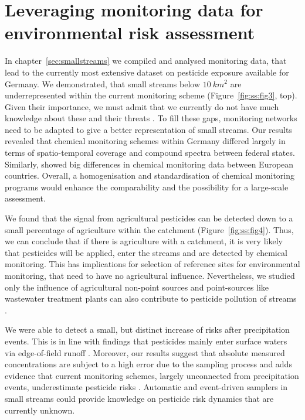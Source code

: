 \section{Leveraging monitoring data for environmental risk assessment}
In chapter~\ref{sec:smallstreams} we compiled and analysed monitoring data, that lead to the currently most extensive dataset on pesticide exposure available for Germany. 
We demonstrated, that small streams below $10~km^2$ are underrepresented within the current monitoring scheme (Figure~\ref{fig:ss:fig3}, top).
Given their importance, we must admit that we currently do not have much knowledge about these and their threats \citep{biggs_importance_2016, lorenz_specifics_2016}. 
To fill these gaps, monitoring networks need to be adapted to give a better representation of small streams. 
Our results revealed that chemical monitoring schemes within Germany differed largely in terms of spatio-temporal coverage and compound spectra between federal states. 
Similarly, \citet{malaj_organic_2014} showed big differences in chemical monitoring data between European countries.
Overall, a homogenisation and standardisation of chemical monitoring programs  would enhance the comparability and the possibility for a large-scale assessment.

We found that the signal from agricultural pesticides can be detected down to a small percentage of agriculture within the catchment (Figure~\ref{fig:ss:fig4}).
Thus, we can conclude that if there is agriculture with a catchment, it is very likely that pesticides will be applied, enter the streams and are detected by chemical monitoring.
This has implications for selection of reference sites for environmental monitoring, that need to have no agricultural influence.
Nevertheless, we studied only the influence of agricultural non-point sources and point-sources like wastewater treatment plants can also contribute to pesticide pollution of streams \citep{bunzel_landscape_2014}.

We were able to detect a small, but distinct increase of risks after precipitation events. 
This is in line with findings that pesticides mainly enter surface waters via edge-of-field runoff \citep{schulz_comparison_2001}.
Moreover, our results suggest that absolute measured concentrations are subject to a high error due to the sampling process and adds evidence that current monitoring schemes, largely unconnected from precipitation events, underestimate pesticide risks \citep{xing_influences_2013, stehle_probabilistic_2013}. 
Automatic and event-driven samplers in small streams could provide knowledge on pesticide risk dynamics that are currently unknown. 

